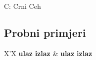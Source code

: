 \begin{statement}[
  timelimit=1 s,
  memorylimit=512 MiB,
]{C: Crni Ceh}
\subsection*{Probni primjeri}
\begin{tabularx}{\textwidth}{X'X}
  \textbf{ulaz}
  \linespread{1}{}
  \textbf{izlaz}
  \linespread{1}{} &
  \textbf{ulaz}
  \linespread{1}{}
  \textbf{izlaz}
  \linespread{1}{}
\end{tabularx}

\end{statement}

